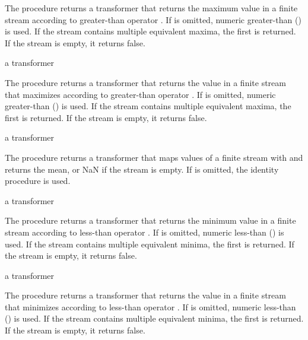 The  procedure returns a transformer that returns the maximum value in a
finite stream according to greater-than operator . If  is omitted, numeric
greater-than (\code{>}) is used. If the stream contains multiple equivalent maxima, the
first is returned. If the stream is empty, it returns false.

\begin{procedure}
\end{procedure}
\returns{} a transformer

The  procedure returns a transformer that returns the value  in a
finite stream that maximizes  according to greater-than
operator . If  is omitted, numeric greater-than (\code{>}) is used. If the
stream contains multiple equivalent maxima, the first is returned. If the stream is empty,
it returns false.

\begin{procedure}
\end{procedure}
\returns{} a transformer

The  procedure returns a transformer that maps values of a finite stream with
 and returns the mean, or NaN if the stream is empty. If  is
omitted, the identity procedure is used.

\begin{procedure}
\end{procedure}
\returns{} a transformer

The  procedure returns a transformer that returns the minimum value in a
finite stream according to less-than operator . If  is omitted, numeric
less-than (\code{<}) is used. If the stream contains multiple equivalent minima, the first
is returned. If the stream is empty, it returns false.

\begin{procedure}
\end{procedure}
\returns{} a transformer

The  procedure returns a transformer that returns the value  in a
finite stream that minimizes  according to less-than
operator . If  is omitted, numeric less-than (\code{<}) is used. If the
stream contains multiple equivalent minima, the first is returned. If the stream is empty,
it returns false.

